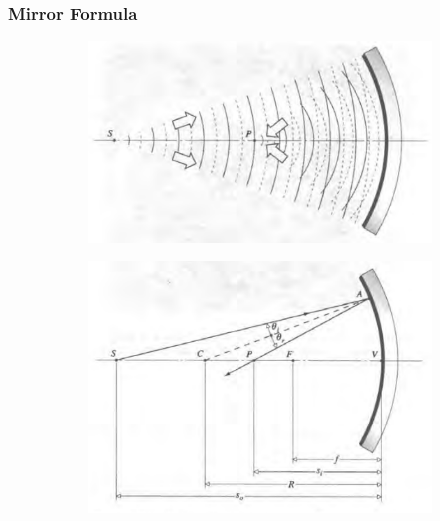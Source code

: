 \subsubsection{Mirror Formula}

\begin{figure}[H]
  \centering
  \begin{subfigure}{.45\textwidth}
    \centering
    \includegraphics[width=\linewidth]{figures/mirror-formula-0.png}
  \end{subfigure}
  \begin{subfigure}{.45\textwidth}
    \centering
    \includegraphics[width=\linewidth]{figures/mirror-formula-1.png}
  \end{subfigure}
\end{figure}

